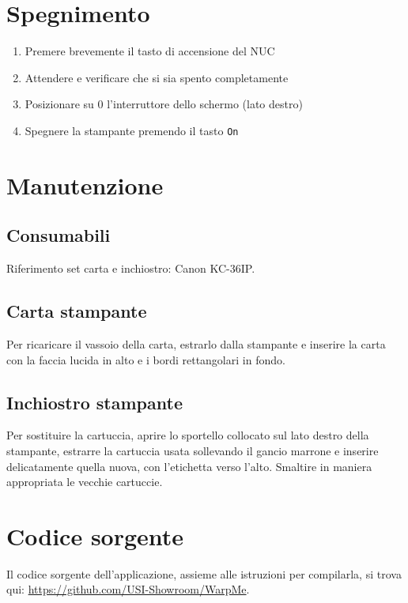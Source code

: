 \documentclass[12pt]{article}
\begin{document}
	
	
\section{Spegnimento}
	
		\begin{enumerate}
			\item Premere brevemente il tasto di accensione del NUC
			\item Attendere e verificare che si sia spento completamente
			\item Posizionare su 0 l'interruttore dello schermo (lato destro)
			\item Spegnere la stampante premendo il tasto \texttt{On}
		\end{enumerate}
	
	
	
\section{Manutenzione}

	\subsection{Consumabili}
	
		Riferimento set carta e inchiostro: Canon KC-36IP.
		

	\subsection{Carta stampante}		
		
		Per ricaricare il vassoio della carta, estrarlo dalla stampante e inserire la carta con la faccia lucida in alto e i bordi rettangolari in fondo.
		
		
	\subsection{Inchiostro stampante}
		
		Per sostituire la cartuccia, aprire lo sportello collocato sul lato destro della stampante, estrarre la cartuccia usata sollevando il gancio marrone e inserire delicatamente quella nuova, con l'etichetta verso l'alto. Smaltire in maniera appropriata le vecchie cartuccie.
		
		
		
\section{Codice sorgente}

	Il codice sorgente dell'applicazione, assieme alle istruzioni per compilarla, si trova qui: \url{https://github.com/USI-Showroom/WarpMe}.
		
	
\end{document}
